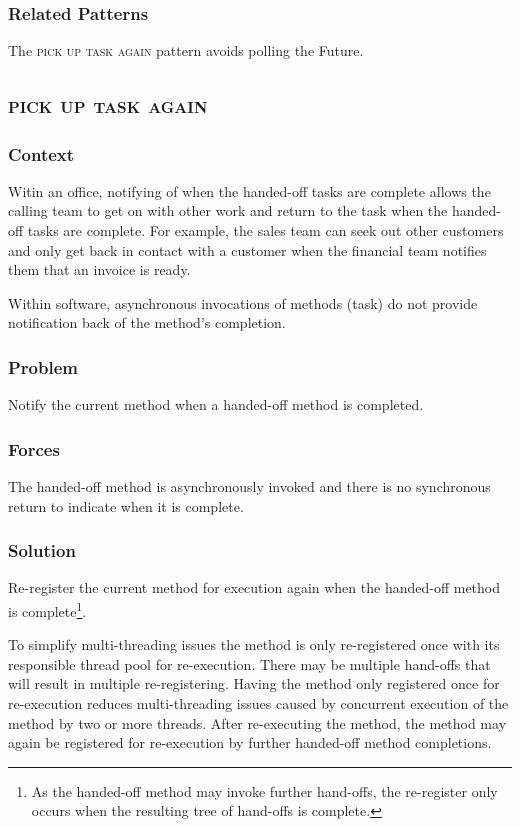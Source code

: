 \documentclass[prodmode]{style/acmlarge}
\begin{document}
\subsubsection*{Related Patterns} The \textsc{pick up task again} pattern avoids
polling the Future.



\subsection{\textsc{\textbf{pick up task again}}}

\subsubsection*{Context} Witin an office, notifying of when the handed-off tasks
are complete allows the calling team to get on with other work and return to the
task when the handed-off tasks are complete.  For example, the sales team can
seek out other customers and only get back in contact with a customer when the
financial team notifies them that an invoice is ready.

Within software, asynchronous invocations of methods (task) do not provide
notification back of the method's completion.

\subsubsection*{Problem} Notify the current method when a handed-off method is
completed.

\subsubsection*{Forces} The handed-off method is asynchronously invoked and there is
no synchronous return to indicate when it is complete.

\subsubsection*{Solution} Re-register the current method for execution again
when the handed-off method is complete\footnote{As the handed-off method may
invoke further hand-offs, the re-register only occurs when the resulting tree of
hand-offs is complete.}.

To simplify multi-threading issues the method is only re-registered once with
its responsible thread pool for re-execution.  There may be multiple hand-offs
that will result in multiple re-registering.  Having the method only registered
once for re-execution reduces multi-threading issues caused by concurrent
execution of the method by two or more threads.  After re-executing the method,
the method may again be registered for re-execution by further handed-off method
completions.
\end{document}
